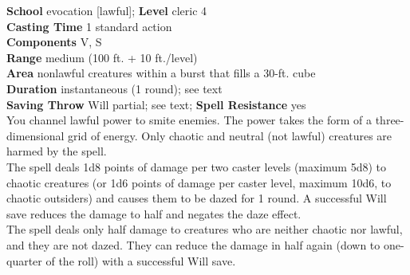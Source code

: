 \textbf{School} evocation [lawful]; \textbf{Level} cleric 4\\
\textbf{Casting Time} 1 standard action\\
\textbf{Components} V, S\\
\textbf{Range }medium (100 ft. + 10 ft./level)\\
\textbf{Area} nonlawful creatures within a burst that fills a 30-ft. cube\\
\textbf{Duration} instantaneous (1 round); see text\\
\textbf{Saving Throw }Will partial; see text; \textbf{Spell Resistance} yes\\
You channel lawful power to smite enemies. The power takes the form of a three-dimensional grid of energy. Only chaotic and neutral (not lawful) creatures are harmed by the spell.\\
The spell deals 1d8 points of damage per two caster levels (maximum 5d8) to chaotic creatures (or 1d6 points of damage per caster level, maximum 10d6, to chaotic outsiders) and causes them to be dazed for 1 round. A successful Will save reduces the damage to half and negates the daze effect.\\
The spell deals only half damage to creatures who are neither chaotic nor lawful, and they are not dazed. They can reduce the damage in half again (down to one-quarter of the roll) with a successful Will save.\\
